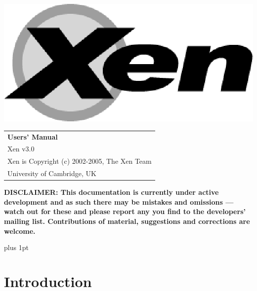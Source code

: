 \documentclass[11pt,twoside,final,openright]{report}
\begin{document}
\pagestyle{empty}
\begin{center}
\vspace*{\fill}
\includegraphics{figs/xenlogo.eps}
\vfill
\vfill
\vfill
\begin{tabular}{l}
{\Huge \bf Users' Manual} \\[4mm]
{\huge Xen v3.0} \\[80mm]

{\Large Xen is Copyright (c) 2002-2005, The Xen Team} \\[3mm]
{\Large University of Cambridge, UK} \\[20mm]
\end{tabular}
\end{center}

{\bf DISCLAIMER: This documentation is currently under active
  development and as such there may be mistakes and omissions --- watch
  out for these and please report any you find to the developers'
  mailing list. Contributions of material, suggestions and corrections
  are welcome.}

\vfill
\cleardoublepage


\pagestyle{plain}
{ \parskip 0pt plus 1pt
  \tableofcontents }
\cleardoublepage


\raggedbottom
{}
\parindent=0pt
\parskip=5pt
\renewcommand{\topfraction}{.8}
\renewcommand{\bottomfraction}{.8}
\renewcommand{\textfraction}{.2}
\renewcommand{\floatpagefraction}{.8}


\part{Introduction}


\end{document}

